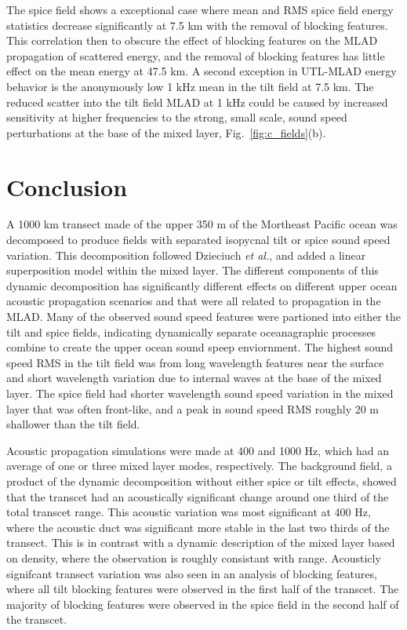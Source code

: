 \documentclass[preprint,NumberedRefs]{JASA}
\begin{document}
The spice field shows a exceptional case where mean and RMS spice field energy statistics decrease significantly at 7.5 km with the removal of blocking features. This correlation then to obscure the effect of blocking features on the MLAD propagation of scattered energy, and the removal of blocking features has little effect on the mean energy at 47.5 km. A second exception in UTL-MLAD energy behavior is the anonymously low 1 kHz mean in the tilt field at 7.5 km. The reduced scatter into the tilt field MLAD at 1 kHz could be caused by increased sensitivity at higher frequencies to the strong, small scale, sound speed perturbations at the base of the mixed layer, Fig.~\ref{fig:c_fields}(b).

\section{Conclusion}\label{sec:conclusion}
A 1000 km transect made of the upper 350 m of the Mortheast Pacific ocean was decomposed to produce fields with separated isopycnal tilt or spice sound speed variation. This decomposition followed Dzieciuch \emph{et al.}\citep{dzieciuch2004}, and added a linear superposition model within the mixed layer. The different components of this dynamic decomposition has significantly different effects on different upper ocean acoustic propagation scenarios and that were all related to propagation in the MLAD. Many of the observed sound speed features were partioned into either the tilt and spice fields, indicating dynamically separate oceanagraphic processes combine to create the upper ocean sound speep enviornment. The highest sound speed RMS in the tilt field was from long wavelength features near the surface and short wavelength variation due to internal waves at the base of the mixed layer. The spice field had shorter wavelength sound speed variation in the mixed layer that was often front-like, and a peak in sound speed RMS roughly 20 m shallower than the tilt field.

Acoustic propagation simulations were made at 400 and 1000 Hz, which had an average of one or three mixed layer modes, respectively. The background field, a product of the dynamic decomposition without either spice or tilt effects, showed that the transcet had an acoustically significant change around one third of the total transcet range. This acoustic variation was most significant at 400 Hz, where the acoustic duct was significant more stable in the last two thirds of the transect. This is in contrast with a dynamic description of the mixed layer based on density\citep{cole2010seasonal}, where the observation is roughly consistant with range. Acousticly signifcant transect variation was also seen in an analysis of blocking features, where all tilt blocking features were observed in the first half of the transcet. The majority of blocking features were observed in the spice field in the second half of the transcet.
\end{document}
